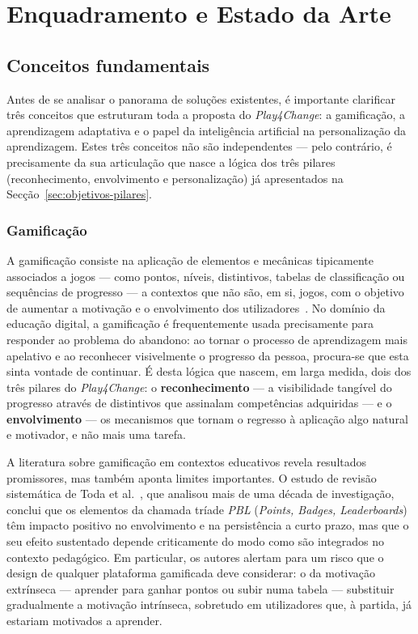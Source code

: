 %
%
\chapter{Enquadramento e Estado da Arte}
\label{cha:enquadramento}

\section{Conceitos fundamentais}
\label{sec:conceitos-fundamentais}

Antes de se analisar o panorama de soluções existentes, é importante clarificar três conceitos que estruturam toda a proposta do \emph{Play4Change}: a gamificação, a aprendizagem adaptativa e o papel da inteligência artificial na personalização da aprendizagem. Estes três conceitos não são independentes --- pelo contrário, é precisamente da sua articulação que nasce a lógica dos três pilares (reconhecimento, envolvimento e personalização) já apresentados na Secção~\ref{sec:objetivos-pilares}.

\subsection*{Gamificação}

\begin{sloppypar}
A gamificação consiste na aplicação de elementos e mecânicas tipicamente associados a jogos --- como pontos, níveis, distintivos, tabelas de classificação ou sequências de progresso --- a contextos que não são, em si, jogos, com o objetivo de aumentar a motivação e o envolvimento dos utilizadores~\cite{ott2019gamification}. No domínio da educação digital, a gamificação é frequentemente usada precisamente para responder ao problema do abandono: ao tornar o processo de aprendizagem mais apelativo e ao reconhecer visivelmente o progresso da pessoa, procura-se que esta sinta vontade de continuar. É desta lógica que nascem, em larga medida, dois dos três pilares do \emph{Play4Change}: o \textbf{reconhecimento} --- a visibilidade tangível do progresso através de distintivos que assinalam competências adquiridas --- e o \textbf{envolvimento} --- os mecanismos que tornam o regresso à aplicação algo natural e motivador, e não mais uma tarefa.
\end{sloppypar}

A literatura sobre gamificação em contextos educativos revela resultados promissores, mas também aponta limites importantes. O estudo de revisão sistemática de Toda et al.~\cite{ott2019gamification}, que analisou mais de uma década de investigação, conclui que os elementos da chamada tríade \emph{PBL} (\emph{Points, Badges, Leaderboards}) têm impacto positivo no envolvimento e na persistência a curto prazo, mas que o seu efeito sustentado depende criticamente do modo como são integrados no contexto pedagógico. Em particular, os autores alertam para um risco que o design de qualquer plataforma gamificada deve considerar: o da motivação extrínseca --- aprender para ganhar pontos ou subir numa tabela --- substituir gradualmente a motivação intrínseca, sobretudo em utilizadores que, à partida, já estariam motivados a aprender.

